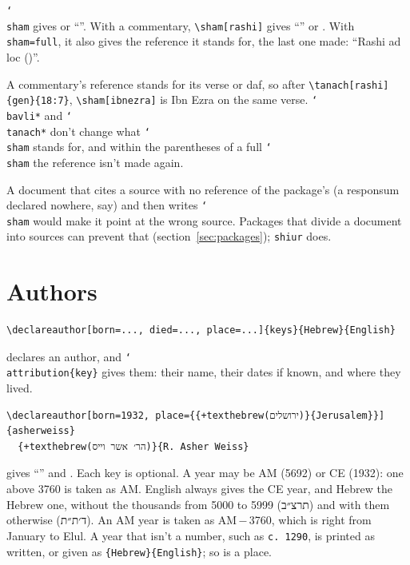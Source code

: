 \documentclass[11pt]{article}
\newcommand{\cs}[1]{\texttt{\char`\\#1}}
\begin{document}
\cs{sham} gives \texthebrew{\sham} or ``\sham''. With a commentary, \verb|\sham[rashi]| gives
``\sham[rashi]'' or \mbox{\texthebrew{\sham[rashi]}}. With \texttt{sham=full}, it also gives the
reference it stands for, the last one made: ``Rashi ad loc ()''.

A commentary's reference stands for its verse or daf, so after
\verb|\tanach[rashi]{gen}{18:7}|, \verb|\sham[ibnezra]| is Ibn Ezra on the same verse.
\cs{bavli*} and \cs{tanach*} don't change what \cs{sham} stands for, and within the parentheses
of a full \cs{sham} the reference isn't made again.

A document that cites a source with no reference of the package's (a responsum declared
nowhere, say) and then writes \cs{sham} would make it point at the wrong source. Packages that
divide a document into sources can prevent that (section~\ref{sec:packages}); \texttt{shiur}
does.

\section{Authors}\label{sec:authors}

\begin{Verbatim}
\declareauthor[born=..., died=..., place=...]{keys}{Hebrew}{English}
\end{Verbatim}
declares an author, and \cs{attribution}\verb|{key}| gives them: their name, their dates if
known, and where they lived.
\begin{Verbatim}[commandchars=+\(\)]
\declareauthor[born=1932, place={{+texthebrew(ירושלים)}{Jerusalem}}]{asherweiss}
  {+texthebrew(הר׳ אשר וייס)}{R. Asher Weiss}
\end{Verbatim}
%
gives ``'' and \mbox{\texthebrew{}}. Each key is
optional. A year may be AM (5692) or CE (1932): one above 3760 is taken as AM. English always
gives the CE year, and Hebrew the Hebrew one, without the thousands from 5000 to 5999
(\texthebrew{תרצ״ב}) and with them otherwise (\texthebrew{ד׳ת״ת}). An AM year is taken as
AM\,$-$\,3760, which is right from January to Elul. A year that isn't a number, such as
\verb|c. 1290|, is printed as written, or given as \verb|{Hebrew}{English}|; so is a place.
\end{document}
